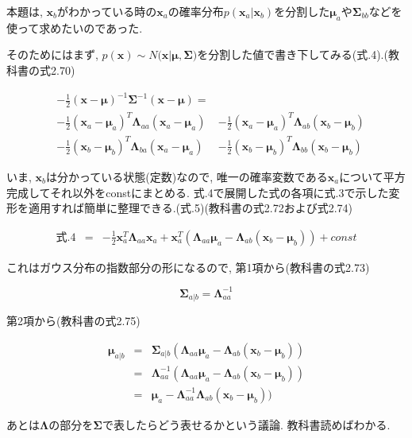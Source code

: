 本題は, $\bm{x}_b$がわかっている時の$\bm{x}_a$の確率分布$p(\bm{x}_a | \bm{x}_b)$を分割した$\bm{\mu}_a$や$\bm{\Sigma}_{bb}$などを使って求めたいのであった.

そのためにはまず, $p(\bm{x}) \sim N(\bm{x}|\bm{\mu}, \bm{\Sigma)}$を分割した値で書き下してみる(式.4).(教科書の式2.70)

\begin{eqnarray}
    &-\frac{1}{2}(\bm{x} - \bm{\mu})^{-1}\bm{\Sigma}^{-1}(\bm{x} - \bm{\mu}) =& \nonumber \\ 
    &-\frac{1}{2}(\bm{x}_{a} - \bm{\mu}_{a})^{T}\bm{\Lambda}_{aa}(\bm{x}_{a} - \bm{\mu}_{a})& - \frac{1}{2}(\bm{x}_{a} - \bm{\mu}_{a})^{T}\bm{\Lambda}_{ab}(\bm{x}_{b} - \bm{\mu}_{b}) \nonumber \\
    &-\frac{1}{2}(\bm{x}_{b} - \bm{\mu}_{b})^{T}\bm{\Lambda}_{ba}(\bm{x}_{a} - \bm{\mu}_{a})& - \frac{1}{2}(\bm{x}_{b} - \bm{\mu}_{b})^{T}\bm{\Lambda}_{bb}(\bm{x}_{b} - \bm{\mu}_{b})
\end{eqnarray}

いま, $\bm{x}_b$は分かっている状態(定数)なので, 唯一の確率変数である$\bm{x}_a$について平方完成してそれ以外をconstにまとめる. 式.4で展開した式の各項に式.3で示した変形を適用すれば簡単に整理できる.(式.5)(教科書の式2.72および式2.74)

\begin{eqnarray}
    {式}.4 &=& -\frac{1}{2}\bm{x}_a^T\bm{\Lambda}_{aa}\bm{x}_a + \bm{x}_a^T(\bm{\Lambda}_{aa}\bm{\mu}_a - \bm{\Lambda}_{ab}(\bm{x}_b - \bm{\mu}_b)) + const
\end{eqnarray}

これはガウス分布の指数部分の形になるので, 第1項から(教科書の式2.73)

$$ \bm{\Sigma}_{a|b} = \bm{\Lambda}_{aa}^{-1} $$

第2項から(教科書の式2.75)

\begin{eqnarray}
    \bm{\mu}_{a|b} &=& \bm{\Sigma}_{a|b}(\bm{\Lambda}_{aa}\bm{\mu}_a - \bm{\Lambda}_{ab}(\bm{x}_b - \bm{\mu}_b)) \nonumber \\
    &=& \bm{\Lambda}_{aa}^{-1}(\bm{\Lambda}_{aa}\bm{\mu}_a - \bm{\Lambda}_{ab}(\bm{x}_b - \bm{\mu}_b)) \nonumber \\
    &=& \bm{\mu}_a - \bm{\Lambda}_{aa}^{-1}\bm{\Lambda}_{ab}(\bm{x}_b - \bm{\mu}_b)) \nonumber
\end{eqnarray}

あとは$\bm{\Lambda}$の部分を$\bm{\Sigma}$で表したらどう表せるかという議論. 教科書読めばわかる.